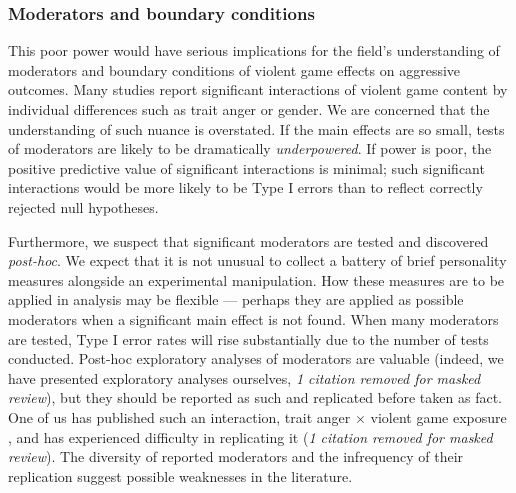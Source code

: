 \documentclass[man, mask]{apa6}
\begin{document}
\subsubsection{Moderators and boundary conditions}
This poor power would have serious implications for the field's understanding of moderators and boundary conditions of violent game effects on aggressive outcomes. Many studies report significant interactions of violent game content by individual differences such as trait anger or gender. We are concerned that the understanding of such nuance is overstated. If the main effects are so small, tests of moderators are likely to be dramatically {\em underpowered}. If power is poor, the positive predictive value of significant interactions is minimal; such significant interactions would be more likely to be Type I errors than to reflect correctly rejected null hypotheses. 

Furthermore, we suspect that significant moderators are tested and discovered {\em post-hoc}. We expect that it is not unusual to collect a battery of brief personality measures alongside an experimental manipulation. How these measures are to be applied in analysis may be flexible --- perhaps they are applied as possible moderators when a significant main effect is not found. When many moderators are tested, Type I error rates will rise substantially due to the number of tests conducted. Post-hoc exploratory analyses of moderators are valuable (indeed, we have presented exploratory analyses ourselves, {\em 1 citation removed for masked review}), but they should be reported as such and replicated before taken as fact. %
One of us has published such an interaction, trait anger $\times$ violent game exposure , and has experienced difficulty in replicating it ({\em 1 citation removed for masked review}). The diversity of reported moderators and the infrequency of their replication suggest possible weaknesses in the literature. %

\end{document}
